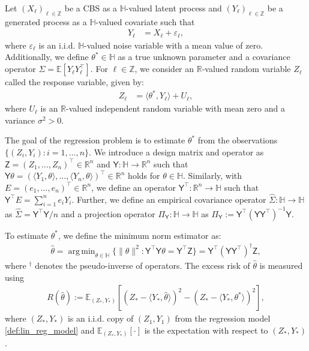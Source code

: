\documentclass[11pt,a4paper]{article}
\theoremstyle{remark}
\theoremstyle{definition}
\DeclareMathOperator*{\argmin}{arg\,min}
\theoremstyle{definition}
\newcommand{\Ep}{\mathbb{E}}
\renewcommand{\hat}{\widehat}
\newcommand{\rc}{\color{black}}
\begin{document}
\begin{bibunit}[apalike]
Let $(X_\ell)_{\ell \in \mathbb{Z}}$ be a CBS as a $\mathbb{H}$-valued latent process and $(Y_\ell)_{\ell \in \mathbb{Z}}$ be a generated process as  a $\mathbb{H}$-valued covariate such that
\begin{align}
    Y_\ell &= X_\ell + \varepsilon_\ell \label{def:lin_reg_latent},
\end{align}
where $\varepsilon_\ell$ is an i.i.d. $\mathbb{H}$-valued noise variable with a mean value of zero.
Additionally, we define $\theta^* \in \mathbb{H}$ as a true unknown parameter and a covariance operator $\Sigma = \Ep[Y_\ell Y_\ell^\top]$.
For $\ell \in \mathbb{Z}$, we consider an $\mathbb{R}$-valued random variable $Z_\ell$ called the response variable, given by:
\begin{align}
    Z_\ell &= \langle \theta^*, Y_\ell \rangle + U_\ell, \label{def:lin_reg_model}
\end{align}
where $U_\ell$ is an $\mathbb{R}$-valued independent random variable with mean zero and a variance  $\sigma^2 > 0$.


The goal of the regression problem is to estimate $\theta^*$ from the observations {\rc $\{(Z_i, Y_i):i=1,\ldots,n\}$}.
We introduce a design matrix and operator as $\mathsf{Z} = (Z_1,\ldots,Z_n)^\top \in \mathbb{R}^{n}$ and $\mathsf{Y}: \mathbb{H} \to \mathbb{R}^n$ such that {\rc $\mathsf{Y} \theta = ( \langle Y_1, \theta \rangle ,\ldots, \langle Y_n, \theta \rangle )^\top \in \mathbb{R}^n$ holds} for $\theta \in \mathbb{H}$.
{\rc Similarly, with $E = (e_1,...,e_n)^\top \in \mathbb{R}^n$, we define an operator $\mathsf{Y}^\top : \mathbb{R}^n \to \mathbb{H}$ such that $\mathsf{Y}^\top E = \sum_{i=1}^n e_i Y_i$.}
{\rc Further, we define an empirical covariance operator $\hat{\Sigma} : \mathbb{H} \to \mathbb{H}$ as $\hat{\Sigma} = \mathsf{Y}^\top \mathsf{Y} / n$ and a projection operator $\Pi_\mathsf{Y}: \mathbb{H} \to \mathbb{H}$ as $\Pi_\mathsf{Y} := \mathsf{Y}^\top (\mathsf{Y} \mathsf{Y}^\top)^{-1} \mathsf{Y}$.}


To estimate $\theta^*$, we define the minimum norm estimator as:
\begin{align}
    \hat{\theta} = \argmin_{\theta \in \mathbb{H}} \{\|\theta\|^2: \mathsf{Y}^\top \mathsf{Y} \theta = \mathsf{Y}^\top \mathsf{Z}\} = \mathsf{Y}^\top (\mathsf{Y} \mathsf{Y}^\top)^\dagger \mathsf{Z}, \label{def:estimator_regression}
\end{align}
where $^\dagger$ denotes the pseudo-inverse of operators.
The excess risk of  $\hat{\theta}$ is measured using 
\begin{align}
    R(\hat{\theta}) := \Ep_{(Z_*, Y_*)}[(Z_* - \langle Y_*, \hat{\theta} \rangle)^2 - (Z_* - \langle Y_*, {\theta}^* \rangle)^2], \label{def:risk_regression}
\end{align}
where $(Z_*, Y_*)$ is an i.i.d. copy of $(Z_1,Y_1)$ from the regression model \eqref{def:lin_reg_model} and $\Ep_{(Z_*, Y_*)}[\cdot]$ is the expectation with respect to $(Z_*, Y_*)$.





\end{bibunit}
\end{document}

